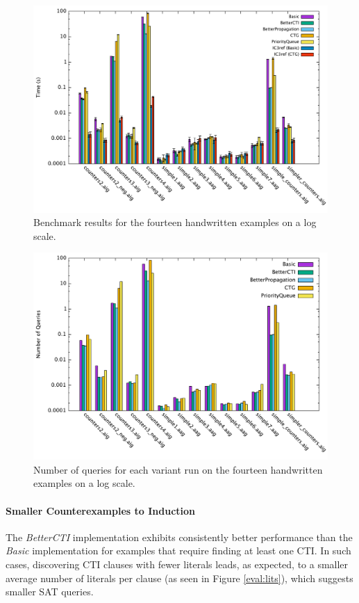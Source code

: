 \documentclass[12pt,a4paper,twoside,openright]{report}
\begin{document}
{\begin{figure}[t]
\includegraphics[width=16cm]{handwritten.pdf}
\caption{Benchmark results for the fourteen handwritten examples on a log scale.}
\label{eval:time}
\end{figure}

\begin{figure}[!ht]
\includegraphics[width=16cm]{numqueries.pdf}
\caption{Number of queries for each variant run on the fourteen handwritten examples on a log scale.}
\label{eval:queries}
\end{figure}

\paragraph{Smaller Counterexamples to Induction}{
The \emph{BetterCTI} implementation exhibits consistently
better performance than the \emph{Basic} implementation for examples
that require finding at least one CTI. In such cases,
discovering CTI clauses with fewer literals leads, as expected, to a smaller average number of
literals per clause (as seen in Figure \ref{eval:lits}), which suggests smaller SAT queries.

}}
\end{document}

